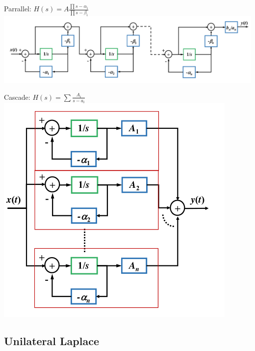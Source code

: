 Parrallel: $H(s)=A\frac{\prod s-\alpha_i}{\prod s - \beta_i}$ \includegraphics[scale=0.2]{inhalt/Parallel.png}

Cascade: $H(s) = \sum \frac{A_i}{s-a_i}$\includegraphics[scale=0.2]{inhalt/cascade.png}

\subsection*{Unilateral Laplace}